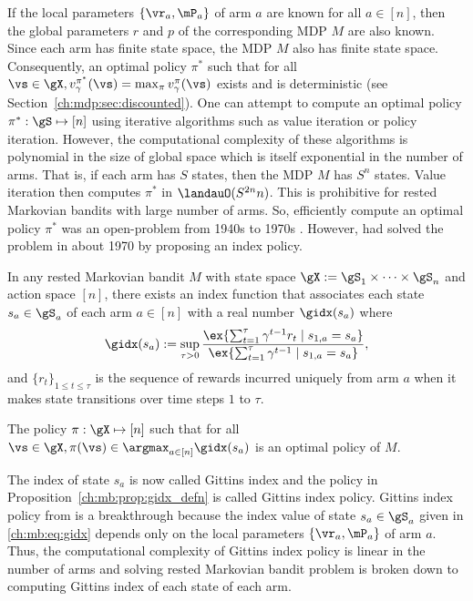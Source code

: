 If the local parameters $\{\vr_a,\mP_a\}$ of arm $a$ are known for all $a\in[n]$, then the global parameters $r$ and $p$ of the corresponding MDP $M$ are also known.
Since each arm has finite state space, the MDP $M$ also has finite state space.
Consequently, an optimal policy $\pi^*$ such that for all $\vs\in\gX, v_\gamma^{\pi^*}(\vs)=\max_{\pi}v_\gamma^\pi(\vs)$ exists and is deterministic (see Section~\ref{ch:mdp:sec:discounted}).
One can attempt to compute an optimal policy $\pi^*:\gS\mapsto[n]$ using iterative algorithms such as value iteration or policy iteration.
However, the computational complexity of these algorithms is polynomial in the size of global space which is itself exponential in the number of arms.
That is, if each arm has $S$ states, then the MDP $M$ has $S^n$ states.
Value iteration then computes $\pi^*$ in $\landauO(S^{2n}n)$.
This is prohibitive for rested Markovian bandits with large number of arms.
So, efficiently compute an optimal policy $\pi^*$ was an open-problem from 1940s to 1970s \cite{whittle1996optimal}.
However, \cite{gittins1979bandit} had solved the problem in about 1970 by proposing an index policy.
\begin{prop}
    \label{ch:mb:prop:gidx_defn}
    In any rested Markovian bandit $M$ with state space $\gX:=\gS_1\times\dots\times\gS_n$ and action space $[n]$, there exists an index function that associates each state $s_a\in\gS_a$ of each arm $a\in[n]$ with a real number $\gidx(s_a)$ where
    \begin{equation}
        \label{ch:mb:eq:gidx}
        \gidx(s_a):=\sup_{\tau>0}\frac{\ex{\sum_{t=1}^{\tau}\gamma^{t-1}r_t \mid s_{1,a}=s_a}}{\ex{\sum_{t=1}^{\tau}\gamma^{t-1}\mid s_{1,a}=s_a}}, 
    \end{equation}
    and $\{r_t\}_{1\le t\le\tau}$ is the sequence of rewards incurred uniquely from arm $a$ when it makes state transitions over time steps $1$ to $\tau$.

    The policy $\pi:\gX\mapsto[n]$ such that for all $\vs\in\gX, \pi(\vs)\in\argmax_{a\in[n]}\gidx(s_a)$ is an optimal policy of $M$.
\end{prop}
The index of state $s_a$ is now called Gittins index and the policy in Proposition~\ref{ch:mb:prop:gidx_defn} is called Gittins index policy.
Gittins index policy from \cite{gittins1979bandit} is a breakthrough because the index value of state $s_a\in\gS_a$ given in \eqref{ch:mb:eq:gidx} depends only on the local parameters $\{\vr_a,\mP_a\}$ of arm $a$.
Thus, the computational complexity of Gittins index policy is linear in the number of arms and solving rested Markovian bandit problem is broken down to computing Gittins index of each state of each arm.

